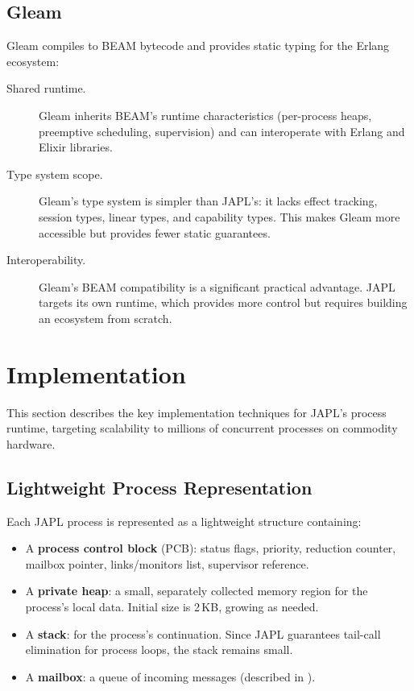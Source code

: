 \documentclass[11pt,a4paper]{article}
\begin{document}
\subsection{Gleam}

Gleam compiles to BEAM bytecode and provides static typing for the Erlang ecosystem:

\begin{description}
\item[Shared runtime.] Gleam inherits BEAM's runtime characteristics (per-process heaps, preemptive scheduling, supervision) and can interoperate with Erlang and Elixir libraries.

\item[Type system scope.] Gleam's type system is simpler than JAPL's: it lacks effect tracking, session types, linear types, and capability types. This makes Gleam more accessible but provides fewer static guarantees.

\item[Interoperability.] Gleam's BEAM compatibility is a significant practical advantage. JAPL targets its own runtime, which provides more control but requires building an ecosystem from scratch.
\end{description}


\section{Implementation}\label{sec:implementation}

This section describes the key implementation techniques for JAPL's process runtime, targeting scalability to millions of concurrent processes on commodity hardware.

\subsection{Lightweight Process Representation}

Each JAPL process is represented as a lightweight structure containing:

\begin{itemize}
\item A \textbf{process control block} (PCB): status flags, priority, reduction counter, mailbox pointer, links/monitors list, supervisor reference.
\item A \textbf{private heap}: a small, separately collected memory region for the process's local data. Initial size is 2\,KB, growing as needed.
\item A \textbf{stack}: for the process's continuation. Since JAPL guarantees tail-call elimination for process loops, the stack remains small.
\item A \textbf{mailbox}: a queue of incoming messages (described in ).
\end{itemize}
\end{document}
